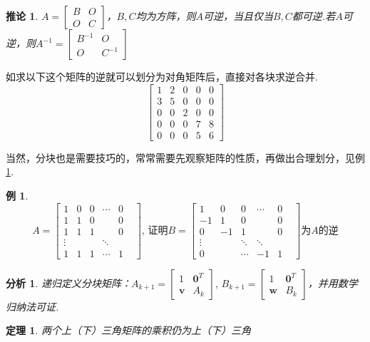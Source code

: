 \documentclass[11pt,UTF8]{ctexart}
\newtheorem{theorem}{定理}
\newtheorem{example}{例}%
\newtheorem*{analysis}{分析}
\newtheorem{corollary}{推论}
\newcommand{\vb}[1]{\mathbf{#1}}
\begin{document}
\begin{corollary}
\label{part_inverse_col}
$A=\begin{bmatrix}B&O \\ O&C\end{bmatrix}$，$B,C$均为方阵，则$A$可逆，当且仅当$B,C$都可逆.若$A$可逆，则$A^{-1}=\begin{bmatrix}B^{-1}&O \\ O&C^{-1}\end{bmatrix}$
\end{corollary}
如求以下这个矩阵的逆就可以划分为对角矩阵后，直接对各块求逆合并.
\[\begin{bmatrix}
1&2&0&0&0\\
3&5&0&0&0\\
0&0&2&0&0\\
0&0&0&7&8\\
0&0&0&5&6
\end{bmatrix}\]
\par 当然，分块也是需要技巧的，常常需要先观察矩阵的性质，再做出合理划分，见例\ref{part_inverse_eg}.
\begin{example}%
\label{part_inverse_eg}
\[A=\begin{bmatrix}1&0&0&\cdots&0\\1&1&0& &0\\1&1&1& &0\\\vdots& & &\ddots& &\\1&1&1&\cdots&1\end{bmatrix},\,\text{证明}B=\begin{bmatrix}1&0&0&\cdots&0\\-1&1&0& &0\\0&-1&1& &0\\\vdots& &\ddots &\ddots& &\\0& &\cdots&-1&1\end{bmatrix}\text{为$A$的逆}\]
\end{example}
\begin{analysis}
递归定义分块矩阵：$A_{k+1}=\begin{bmatrix}1&\vb{0}^T\\\vb{v}&A_k\end{bmatrix},\,B_{k+1}=\begin{bmatrix}1&\vb{0}^T\\\vb{w}&B_k\end{bmatrix}$，并用数学归纳法可证.
\end{analysis}
\begin{theorem}
两个上（下）三角矩阵的乘积仍为上（下）三角
\end{theorem}
\end{document}
